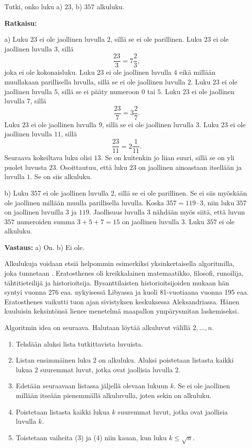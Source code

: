 \begin{esimerkki}
Tutki, onko luku a) $23$, b) $357$ alkuluku.

{\bf Ratkaisu:}

a) Luku $23$ ei ole jaollinen luvulla $2$, sillä se ei ole
parillinen. Luku $23$ ei ole jaollinen luvulla $3$, sillä
\[
\frac{23}{3}= 7\frac{2}{3},
\]
joka ei ole kokonaisluku. Luku $23$ ei ole jaollinen luvulla $4$
eikä millään muullakaan parillisella luvulla, sillä se ei ole
jaollinen luvulla $2$. Luku $23$ ei ole
jaollinen luvulla $5$, sillä se ei pääty numeroon $0$ tai $5$.
Luku $23$ ei ole jaollinen luvulla $7$, sillä
\[
\frac{23}{7} = 3\frac{2}{7}.
\]
Luku $23$ ei ole jaollinen luvulla $9$, sillä se ei ole jaollinen
luvulla $3$. Luku $23$ ei ole jaollinen luvulla $11$, sillä
\[
\frac{23}{11} = 2\frac{1}{11}.
\]
Seuraava kokeiltava luku olisi $13$. Se on kuitenkin jo liian
suuri, sillä se on yli puolet luvusta $23$. Osoittautuu, että
luku $23$ on jaollinen ainoastaan itsellään ja luvulla $1$. Se on
siis alkuluku.

b) Luku $357$ ei ole jaollinen luvulla $2$, sillä se ei ole
parillinen. Se ei siis myöskään ole jaollinen millään muulla
parillisella luvulla. Koska $357 = 119 \cdot 3$, niin luku $357$
on jaollinen luvuilla $3$ ja $119$. Jaollisuus luvulla $3$
nähdään myös siitä, että luvun $357$ numeroiden summa $3 + 5 + 7
= 15$ on jaollinen luvulla $3$. Luku $357$ ei ole alkuluku.

{\bf Vastaus:} a) On. b) Ei ole.
\end{esimerkki}

Alkulukuja voidaan etsiä helpommin esimerkiksi yksinkertaisella algoritmilla, joka tunnetaan . Eratosthenes oli kreikkalainen matemaatikko, filosofi, runoilija, tähtitieteilijä ja historioitsija. Bysanttilaisten historioitsijoiden mukaan hän syntyi vuonna 276 eaa. nykyisessä Libyassa ja kuoli 81-vuotiaana vuonna 195 eaa. Eratosthenes vaikutti tuon ajan sivistyksen keskuksessa Aleksandriassa. Hänen kuuluisin keksintönsä lienee menetelmä maapallon ympärysmitan laskemiseksi. %

Algoritmin idea on seuraava. Halutaan löytää alkuluvut välillä $2, \ldots, n$.
\begin{enumerate}
\item Tehdään aluksi lista tutkittavista luvuista. 
\item Listan ensimmäinen luku $2$ on alkuluku. Aluksi poistetaan listasta kaikki lukua $2$ suuremmat luvut, jotka ovat jaollisia luvulla $2$.
\item Edetään seuraavaan listassa jäljellä olevaan lukuun $k$. Se ei ole jaollinen millään itseään pienemmällä alkuluvulla, joten sekin on alkuluku.
\item Poistetaan listasta kaikki lukua $k$ suuremmat luvut, jotka ovat jaollisia luvulla $k$.
\item Toistetaan vaiheita (3) ja (4) niin kauan, kun luku $k \le \sqrt{n}$. 
\end{enumerate}

